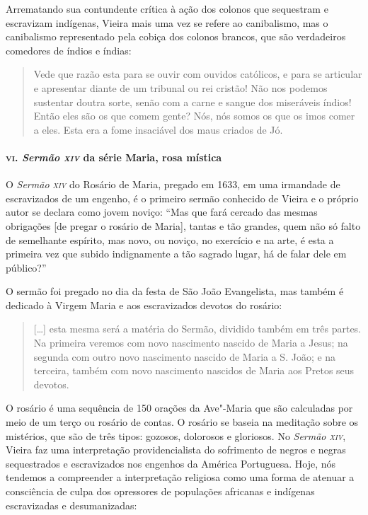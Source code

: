Arrematando sua contundente crítica à ação dos colonos que sequestram e
escravizam indígenas, Vieira mais uma vez se refere ao canibalismo, mas
o canibalismo representado pela cobiça dos colonos brancos, que são
verdadeiros comedores de índios e índias:

\begin{quote}
Vede que razão esta para se ouvir com ouvidos católicos, e para se
articular e apresentar diante de um tribunal ou rei cristão! Não nos
podemos sustentar doutra sorte, senão com a carne e sangue dos
miseráveis índios! Então eles são os que comem gente? Nós, nós somos os
que os imos comer a eles. Esta era a fome insaciável dos maus criados de
Jó.
\end{quote}

\paragraph{\textsc{vi}. \emph{Sermão \textsc{xiv}} da série Maria, rosa mística}

O \emph{Sermão \textsc{xiv}} do Rosário de Maria, pregado em 1633, em uma
irmandade de escravizados de um engenho, é o primeiro sermão conhecido
de Vieira e o próprio autor se declara como jovem noviço: ``Mas que fará
cercado das mesmas obrigações {[}de pregar o rosário de Maria{]}, tantas
e tão grandes, quem não só falto de semelhante espírito, mas novo, ou
noviço, no exercício e na arte, é esta a primeira vez que subido
indignamente a tão sagrado lugar, há de falar dele em público?''

O sermão foi pregado no dia da festa de São João Evangelista, mas também
é dedicado à Virgem Maria e aos escravizados devotos do rosário:

\begin{quote}
{[}\ldots{}{]} esta mesma será a matéria do Sermão, dividido também em três
partes. Na primeira veremos com novo nascimento nascido de Maria a
Jesus; na segunda com outro novo nascimento nascido de Maria a S. João;
e na terceira, também com novo nascimento nascidos de Maria aos Pretos
seus devotos.
\end{quote}

O rosário é uma sequência de 150 orações da Ave"-Maria que são calculadas
por meio de um terço ou rosário de contas. O rosário se baseia na
meditação sobre os mistérios, que são de três tipos: gozosos, dolorosos
e gloriosos. No \emph{Sermão \textsc{xiv}}, Vieira faz uma interpretação
providencialista do sofrimento de negros e negras sequestrados e
escravizados nos engenhos da América Portuguesa. Hoje, nós tendemos a
compreender a interpretação religiosa como uma forma de atenuar a
consciência de culpa dos opressores de populações africanas e indígenas
escravizadas e desumanizadas:

